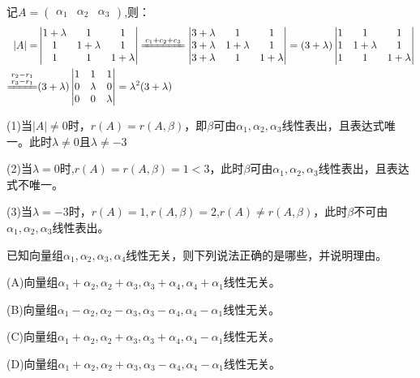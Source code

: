 \documentclass[a4paper]{report}
\begin{document}
\begin{jie}
记$A=\begin{pmatrix}
  \alpha_1&\alpha_2&\alpha_3
\end{pmatrix}$,则：
\begin{align*}
|A|=&\begin{vmatrix}
1+\lambda&1&1\\
1&1+\lambda&1\\
1&1&1+\lambda
\end{vmatrix}\xlongequal{c_{1}+c_{2}+c_3}
\begin{vmatrix}
3+\lambda&1&1\\
3+\lambda&1+\lambda&1\\
3+\lambda&1&1+\lambda
\end{vmatrix}=(3+\lambda)
\begin{vmatrix}
1&1&1\\
1&1+\lambda&1\\
1&1&1+\lambda
\end{vmatrix}\\
\xlongequal{\substack{r_2-r_1 \\ r_3-r_1}}&
(3+\lambda)\begin{vmatrix}
1&1&1\\
0&\lambda&0\\
0&0&\lambda
\end{vmatrix}=\lambda^2(3+\lambda)
\end{align*}

(1)当$|A|\neq 0$时，$r(A)=r(A,\beta)$，即$\beta$可由$\alpha_1,\alpha_2,\alpha_3$线性表出，且表达式唯一。此时$\lambda\neq0$且$\lambda\neq -3$

(2)当$\lambda=0$时,$r(A)=r(A,\beta)=1<3$，此时$\beta$可由$\alpha_1,\alpha_2,\alpha_3$线性表出，且表达式不唯一。

(3)当$\lambda=-3$时，$r(A)=1,r(A,\beta)=2$,$r(A)\neq r(A,\beta)$，此时$\beta$不可由$\alpha_1,\alpha_2,\alpha_3$线性表出。
\end{jie}


\EX 已知向量组$\alpha_1,\alpha_2,\alpha_3,\alpha_4$线性无关，则下列说法正确的是哪些，并说明理由。

(A)向量组$\alpha_1+\alpha_2,\alpha_2+\alpha_3,\alpha_3+\alpha_4,\alpha_4+\alpha_1$线性无关。

(B)向量组$\alpha_1-\alpha_2,\alpha_2-\alpha_3,\alpha_3-\alpha_4,\alpha_4-\alpha_1$线性无关。

(C)向量组$\alpha_1+\alpha_2,\alpha_2+\alpha_3,\alpha_3+\alpha_4,\alpha_4-\alpha_1$线性无关。

(D)向量组$\alpha_1+\alpha_2,\alpha_2+\alpha_3,\alpha_3-\alpha_4,\alpha_4-\alpha_1$线性无关。
\end{document}
